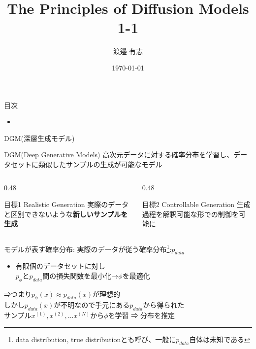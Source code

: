 \documentclass{beamer}
\title{The Principles of Diffusion Models 1-1}
\author{渡邉 有志}
\date{\today}
\begin{document}
\begin{frame}
    \titlepage
\end{frame}

\begin{frame}{目次}
    
    \begin{itemize}
        \item 
    \end{itemize}
\end{frame}

\begin{frame}{DGM(深層生成モデル)}
\begin{block}{DGM(Deep Generative Models)}
高次元データに対する確率分布を学習し、データセットに類似したサンプルの生成が可能なモデル\\
\end{block}

\vspace{-1em}           

\begin{columns}[T]
\begin{column}{0.48\textwidth}
\begin{exampleblock}{\small 目標1 Realistic Generation}
\small 実際のデータと区別できないような\textbf{新しいサンプルを生成}
\end{exampleblock}
\end{column}

\begin{column}{0.48\textwidth}
\begin{exampleblock}{\small 目標2 Controllable Generation}
\small 生成過程を解釈可能な形での制御を可能に
\end{exampleblock}
\end{column}
\end{columns}

\vspace{1em}     

\small モデルが表す確率分布:  実際のデータが従う確率分布\footnote{data distribution, true distributionとも呼び、一般に$p_{data}$自体は未知である}:$p_{data}$\unboldmath\\

\begin{itemize}
\item 有限個のデータセットに対し\\
$p_{\phi}$と$p_{data}$間の損失関数を最小化→${\phi}$を最適化
\end{itemize}

\begin{exampleblock}{}
⇒つまり$p_{\phi}(x)\approx p_{data}(x)$が理想的\\
しかし$p_{data}(x)$が不明なので手元にある$p_{data}$から得られた\\サンプル$x^{(1)},x^{(2)},...x^{(N)}$から$\phi$を学習 ⇒ 分布を推定
\end{exampleblock}
\end{frame}
\end{document}
